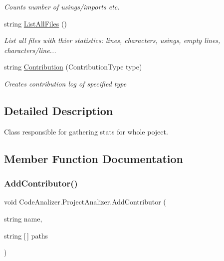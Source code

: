 \begin{DoxyCompactItemize}
\begin{DoxyCompactList}\small\item\em Counts number of usings/imports etc. \end{DoxyCompactList}\item 
string \mbox{\hyperlink{class_code_analizer_1_1_project_analizer_acf4aae301520f5a14168668007c39cf6}{List\+All\+Files}} ()
\begin{DoxyCompactList}\small\item\em List all files with thier statistics\+: lines, characters, usings, empty lines, characters/line... \end{DoxyCompactList}\item 
string \mbox{\hyperlink{class_code_analizer_1_1_project_analizer_a1403b55c5ff8ed558878246b5ff67ed1}{Contribution}} (Contribution\+Type type)
\begin{DoxyCompactList}\small\item\em Creates contribution log of specified type \end{DoxyCompactList}\end{DoxyCompactItemize}


\subsection{Detailed Description}
Class responsible for gathering stats for whole poject. 



\subsection{Member Function Documentation}
\mbox{\label{class_code_analizer_1_1_project_analizer_a211cc82430d4b716fde6425c3d919be3}} 
\subsubsection{\texorpdfstring{Add\+Contributor()}{AddContributor()}}
{\footnotesize\ttfamily void Code\+Analizer.\+Project\+Analizer.\+Add\+Contributor (\begin{DoxyParamCaption}\item[{string}]{name,  }\item[{string \mbox{[}$\,$\mbox{]}}]{paths }\end{DoxyParamCaption})}



